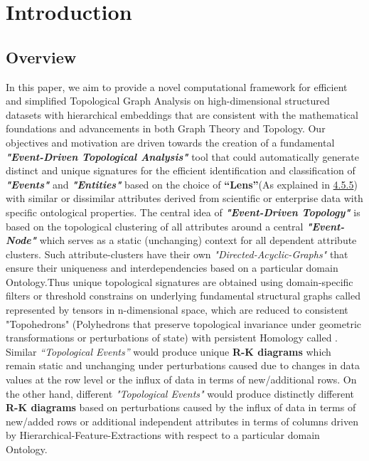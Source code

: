 \section{Introduction}

\subsection{Overview}
In this paper, we aim to provide a novel computational framework for efficient and simplified Topological Graph Analysis \cite{01.3_2016TDANewOpportunities} \cite{01.6_GTIntro} \cite{17.1_2012foundationsTGT} \cite{17.3_1996topologicalGT} \cite{17.4_TGTRecentResults}on high-dimensional structured datasets with hierarchical embeddings that are consistent with the mathematical foundations and advancements in both Graph Theory \cite{01.8_ModernGT} and Topology.\cite{01.1_1stCourse2018algebraicTopo} Our objectives and motivation are driven towards the creation of a fundamental \textbf{\textit{"Event-Driven Topological Analysis"}} tool that could automatically generate distinct and unique signatures for the efficient identification and classification of \textbf{\textit{"Events"}} and \textbf{\textit{"Entities"}} based on the choice of \textbf{``Lens''}(As explained in \hyperref[sec:sectionlens]{4.5.5}) with similar or dissimilar attributes derived from scientific or enterprise data with specific ontological properties. The central idea of \textbf{\textit{"Event-Driven Topology"}} is based on the topological clustering \cite{04.0_1975clusteringbook} \cite{06.1_carlsson2008persistentHomo} of all attributes around a central \textbf{\textit{"Event-Node"}} which serves as a static (unchanging) context for all dependent  attribute clusters. Such attribute-clusters have their own \textit{"Directed-Acyclic-Graphs"} \cite{20.0_2013AlgebraOfDAGs} \cite{20.1_2001DAGMechanics} that ensure their uniqueness and interdependencies based on a particular domain Ontology.Thus unique topological signatures are obtained using domain-specific filters or threshold constrains on underlying fundamental structural graphs called \textbf{} represented by tensors in n-dimensional space, which are reduced to consistent "Topohedrons" (Polyhedrons that preserve topological invariance under geometric transformations or perturbations of state) with persistent Homology called  \textbf{}.  Similar \textit{``Topological Events''} would produce unique \textbf{R-K diagrams} which remain static and unchanging under perturbations caused due to changes in data values at the row level or the influx of data in terms of new/additional rows. On the other hand, different \textit{"Topological  Events"} would produce distinctly different \textbf{R-K diagrams} based on perturbations caused by  the influx of data in terms of new/added rows or additional independent attributes in terms of columns driven by Hierarchical-Feature-Extractions with respect to a particular domain Ontology.

